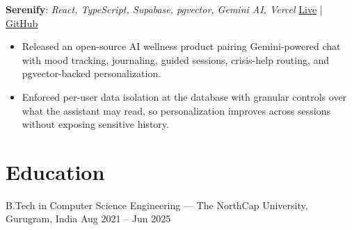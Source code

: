 \documentclass[letterpaper,10pt]{article}
\newcommand{\resumeItem}[1]{\item\footnotesize{#1}}
\begin{document}
\textbf{Serenify}: \textit{React, TypeScript, Supabase, pgvector, Gemini AI, Vercel} \hfill \href{https://serenify.codenex.dev/}{Live} | \href{https://github.com/Nikunj2003/Serenify}{GitHub}
\begin{itemize}[leftmargin=0.16in, itemsep=0pt, topsep=1pt]
  \resumeItem{Released an open-source AI wellness product pairing Gemini-powered chat with mood tracking, journaling, guided sessions, crisis-help routing, and pgvector-backed personalization.}
  \resumeItem{Enforced per-user data isolation at the database with granular controls over what the assistant may read, so personalization improves across sessions without exposing sensitive history.}
\end{itemize}

\section{Education}
\footnotesize
B.Tech in Computer Science Engineering --- The NorthCap University, Gurugram, India \hfill Aug 2021 -- Jun 2025\\
\end{document}
